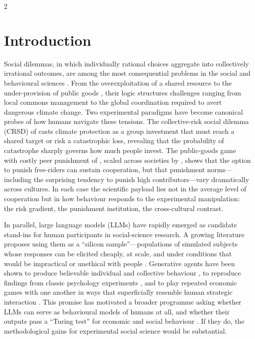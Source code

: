 \documentclass[openacc]{rsproca_new}%
\begin{document}
\begin{multicols}{2}

\section{Introduction}

Social dilemmas, in which individually rational choices aggregate into collectively irrational outcomes, are among the most consequential problems in the social and behavioural sciences \cite{dawes1980social}. From the overexploitation of a shared resource \cite{hardin1968tragedy} to the under-provision of public goods \cite{ledyard1995public}, their logic structures challenges ranging from local commons management \cite{ostrom1990governing} to the global coordination required to avert dangerous climate change. Two experimental paradigms have become canonical probes of how humans navigate these tensions. The collective-risk social dilemma (CRSD) of \cite{milinski2008climate} casts climate protection as a group investment that must reach a shared target or risk a catastrophic loss, revealing that the probability of catastrophe sharply governs how much people invest. The public-goods game with costly peer punishment of \cite{fehr2002altruistic}, scaled across societies by \cite{herrmann2008antisocial}, shows that the option to punish free-riders can sustain cooperation, but that punishment norms---including the surprising tendency to punish high contributors---vary dramatically across cultures. In each case the scientific payload lies not in the average level of cooperation but in how behaviour responds to the experimental manipulation: the risk gradient, the punishment institution, the cross-cultural contrast.

In parallel, large language models (LLMs) have rapidly emerged as candidate stand-ins for human participants in social-science research. A growing literature proposes using them as a ``silicon sample''---populations of simulated subjects whose responses can be elicited cheaply, at scale, and under conditions that would be impractical or unethical with people \cite{argyle2023out,horton2023llm}. Generative agents have been shown to produce believable individual and collective behaviour \cite{park2023generative}, to reproduce findings from classic psychology experiments \cite{aher2023using}, and to play repeated economic games with one another in ways that superficially resemble human strategic interaction \cite{akata2023playing}. This promise has motivated a broader programme asking whether LLMs can serve as behavioural models of humans at all, and whether their outputs pass a ``Turing test'' for economic and social behaviour \cite{mei2024turing}. If they do, the methodological gains for experimental social science would be substantial.


\end{multicols}
\end{document}
